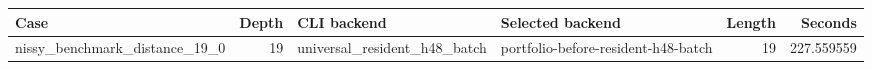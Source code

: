 {\small
\begin{tabular}{lrllrr}
\hline
Case & Depth & CLI backend & Selected backend & Length & Seconds \\
\hline
nissy\_benchmark\_distance\_19\_0 & 19 & universal\_resident\_h48\_batch & portfolio-before-resident-h48-batch & 19 & 227.559559 \\
\hline
\end{tabular}
}
